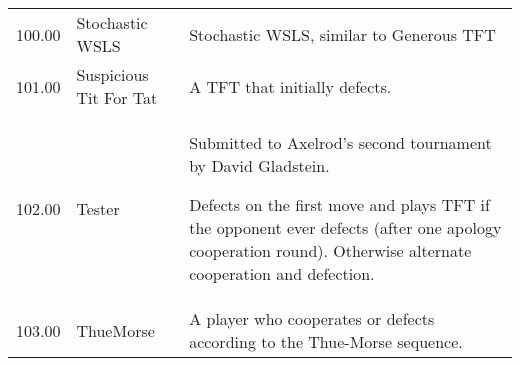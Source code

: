 \begin{table}[!hbtp]
\begin{adjustbox}{width=2\textwidth, angle=90}
\begin{tabular}{rll}
	100.00 & Stochastic WSLS             & Stochastic WSLS, similar to Generous TFT                                                                                          \\
	101.00 & Suspicious Tit For Tat      & A TFT that initially defects.                                                                                                     \\
	102.00 & Tester                      & Submitted to Axelrod's second tournament by David Gladstein.

	Defects on the first move and plays TFT if the opponent ever defects (after
	one apology cooperation round). Otherwise alternate cooperation and defection.                                                                                                                                                                                                                                                                                                                                                                                                                                                                                                                                                                                                                                                                                                                                                                                         \\
	103.00 & ThueMorse                   & A player who cooperates or defects according to the Thue-Morse sequence.


\end{tabular}
\end{adjustbox}
\end{table}
